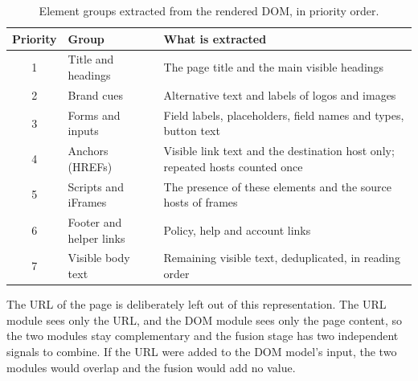 \documentclass{FastFyp}
\begin{document}
\begin{table}[!ht]
\centering
\caption{Element groups extracted from the rendered DOM, in priority order.}
\label{tab:dom-groups}
\begin{tabularx}{\textwidth}{|c|>{\raggedright\arraybackslash}X|>{\raggedright\arraybackslash}X|}
\hline
\textbf{Priority} & \textbf{Group} & \textbf{What is extracted} \\
\hline
1 & Title and headings & The page title and the main visible headings \\
\hline
2 & Brand cues & Alternative text and labels of logos and images \\
\hline
3 & Forms and inputs & Field labels, placeholders, field names and types, button text \\
\hline
4 & Anchors (HREFs) & Visible link text and the destination host only; repeated hosts counted once \\
\hline
5 & Scripts and iFrames & The presence of these elements and the source hosts of frames \\
\hline
6 & Footer and helper links & Policy, help and account links \\
\hline
7 & Visible body text & Remaining visible text, deduplicated, in reading order \\
\hline
\end{tabularx}
\end{table}

The URL of the page is deliberately left out of this representation. The URL module sees only the URL, and the DOM module sees only the page content, so the two modules stay complementary and the fusion stage has two independent signals to combine. If the URL were added to the DOM model's input, the two modules would overlap and the fusion would add no value.
\end{document}
